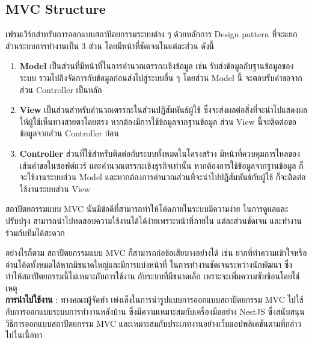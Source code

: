 \subsection{MVC Structure}
เฟรมเวิร์กสำหรับการออกแบบสถาปัตยกรรมระบบต่าง ๆ ด้วยหลักการ Design pattern 
ที่จะแยกส่วนระบบการทำงานเป็น 3 ส่วน โดยมีหน้าที่ชัดเจนในแต่ละส่วน ดังนี้
\begin{enumerate}
    \item \textbf{Model} เป็นส่วนที่มีหน้าที่ในการคำนวณตรรกะเชิงข้อมูล เช่น รับส่งข้อมูลกับฐานข้อมูลของระบบ รวมไปถึงจัดการกับข้อมูลก่อนส่งไปสู่ระบบอื่น ๆ โดยส่วน Model นี้ จะตอบรับคำขอจากส่วน Controller เป็นหลัก
    \item \textbf{View} เป็นส่วนสำหรับคำนวณตรรกะในส่วนปฏิสัมพันธ์ผู้ใช้ ซึ่งจะส่งผลต่อสิ่งที่จะนำไปแสดงผลให้ผู้ใช้เห็นทางสายตาโดยตรง หากต้องมีการใช้ข้อมูลจากฐานข้อมูล ส่วน View นี้จะติดต่อขอข้อมูลจากส่วน Controller ก่อน
    \item \textbf{Controller} ส่วนที่ใช้สำหรับติดต่อกับระบบทั้งหมดในโครงสร้าง มีหน้าที่ควบคุมการไหลของเส้นคำขอในซอฟต์แวร์ และคำนวณตรรกะเชิงธุรกิจเท่านั้น หากต้องการใช้ข้อมูลจากฐานข้อมูล ก็จะใช้งานระบบส่วน Model และหากต้องการคำนวณส่วนที่จะนำไปปฏิสัมพันธ์กับผู้ใช้ ก็จะติดต่อใช้งานระบบส่วน View
\end{enumerate}
\par สถาปัตยกรรมแบบ MVC นั้นมีข้อดีที่สามารถทำให้โค้ดภายในระบบมีความง่าย
ในการดูแลและปรับปรุง สามารถนำไปทดสอบความใช้งานได้ได้ง่ายเพราะหน้าที่ภายใน
แต่ละส่วนชัดเจน และทำงานร่วมกับทีมได้สะดวก
\par อย่างไรก็ตาม สถาปัตยกรรมแบบ MVC ก็สามารถก่อข้อเสียบางอย่างได้ เช่น 
ยากที่ทำความเข้าใจหรืออ่านโค้ดทั้งหมดได้หากมีขนาดใหญ่และมีการแบ่งหน้าที่
ในการทำงานชัดเจนระหว่างนักพัฒนา ซึ่งทำให้สถาปัตยกรรมนี้ไม่เหมาะกับการใช้งาน
กับระบบที่มีขนาดเล็ก เพราะจะเพิ่มความซับซ้อนโดยใช่เหตุ \\
\textbf{การนำไปใช้งาน} : ทางคณะผู้จัดทำ เพ่งเล็งในการนำรูปแบบการออกแบบสถาปัตยกรรม MVC ไปใช้กับการออกแบบระบบการทำงานหลังบ้าน ซึ่งมีความเหมาะสมกับเครื่องมืออย่าง NestJS ซึ่งสนับสนุนวิธีการออกแบบสถาปัตยกรรม MVC และเหมาะสมกับประเภทงานอย่างเว็บแอปพลิเคชันตามที่กล่าวไปในเนื้อหา
